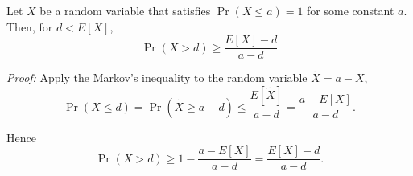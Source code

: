 \documentclass[12pt]{article}
\begin{document}
Let $X$ be a random variable that satisfies $\Pr(X \leq a) = 1$ for some constant $a$.
Then, for $d < E[X]$,
\[
\Pr( X > d) \geq \frac{E[X] - d}{a - d}
\]



{\em Proof:}
Apply the Markov's inequality to the random variable $\tilde{X} = a-X$,
\[\Pr(X\leq d) = \Pr(\tilde{X}\geq a-d) 
\leq \frac{E[\tilde{X}]}{a-d} 
= \frac{a-E[X]}{a-d}.
\]

Hence
\[
\Pr(X> d) \geq 1 - \frac{a-E[X]}{a-d} = \frac{E[X]-d}{a-d}.
\]
\end{document}
